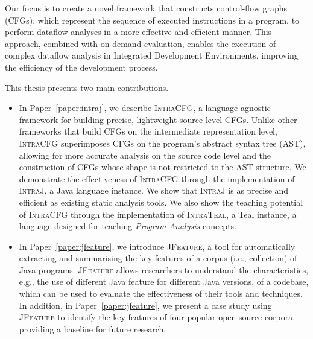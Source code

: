Our focus is to create a novel framework that constructs control-flow graphs (CFGs), which represent the
sequence of executed instructions in a program, to perform dataflow analyses in a
more effective and efficient manner. This approach, combined with on-demand evaluation,
enables the execution of complex dataflow analysis in Integrated Development Environments,
improving the efficiency of the development process.

This thesis presents two main contributions.
\begin{itemize}
	\item In Paper~\ref{paper:intraj},  we describe \textsc{IntraCFG}, a language-agnostic framework for building
	precise, lightweight source-level CFGs. Unlike other frameworks that
	build CFGs on the intermediate representation level, \textsc{IntraCFG} superimposes
	CFGs on the program's abstract syntax tree (AST), allowing for more accurate
	analysis on the source code level and the construction of CFGs whose shape is not
	restricted to the AST structure. We demonstrate the effectiveness
	of \textsc{IntraCFG} through the implementation of \textsc{IntraJ}, a Java language
	instance. We show that \textsc{IntraJ} is as precise and efficient as existing
	static analysis tools. We also show the teaching potential of \textsc{IntraCFG}
	through the implementation of \textsc{IntraTeal}, a Teal instance,
	 a language designed for teaching \emph{Program Analysis} concepts.
	\item In Paper~\ref{paper:jfeature}, we introduce \textsc{JFeature}, a tool for automatically extracting and summarising
	the key features of a corpus (i.e., collection) of Java programs. \textsc{JFeature}
	allows researchers to understand the characteristics, e.g.,
	the use of different Java feature for different Java versions, of a codebase,
	which can be used to evaluate the effectiveness of their tools and techniques.
	In addition, in Paper~\ref{paper:jfeature}, we present a case study using \textsc{JFeature} to
	identify the key features of four popular open-source corpora, providing a
	baseline for future research.
\end{itemize}


